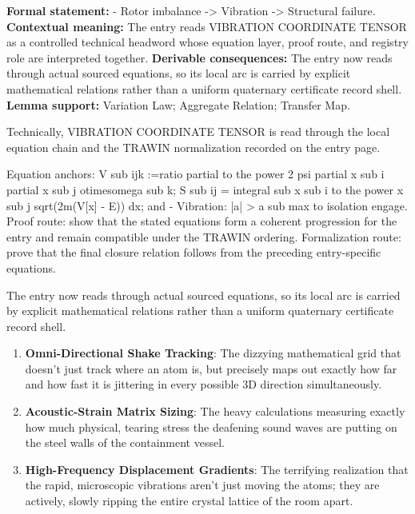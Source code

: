 \begingroup\footnotesize\setlength{\emergencystretch}{3em}\sloppy
\textbf{Formal statement:} - Rotor imbalance -> Vibration -> Structural failure. \textbf{Contextual meaning:} The entry reads VIBRATION COORDINATE TENSOR as a controlled technical headword whose equation layer, proof route, and registry role are interpreted together. \textbf{Derivable consequences:} The entry now reads through actual sourced equations, so its local arc is carried by explicit mathematical relations rather than a uniform quaternary certificate record shell. \textbf{Lemma support:} Variation Law; Aggregate Relation; Transfer Map.\par
\endgroup

Technically, VIBRATION COORDINATE TENSOR is read through the local equation chain and the TRAWIN normalization recorded on the entry page.

Equation anchors: V sub ijk :=ratio partial to the power 2 psi partial x sub i partial x sub j otimesomega sub k; S sub ij = integral sub x sub i to the power x sub j sqrt(2m(V[x] - E)) dx; and - Vibration: |a| > a sub max to isolation engage. Proof route: show that the stated equations form a coherent progression for the entry and remain compatible under the TRAWIN ordering. Formalization route: prove that the final closure relation follows from the preceding entry-specific equations.

The entry now reads through actual sourced equations, so its local arc is carried by explicit mathematical relations rather than a uniform quaternary certificate record shell.
\endgroup

\begin{enumerate}[leftmargin=1.6em,itemsep=6pt,topsep=4pt]
\item \textbf{Omni-Directional Shake Tracking}: The dizzying mathematical grid that doesn't just track where an atom is, but precisely maps out exactly how far and how fast it is jittering in every possible 3D direction simultaneously.
\item \textbf{Acoustic-Strain Matrix Sizing}: The heavy calculations measuring exactly how much physical, tearing stress the deafening sound waves are putting on the steel walls of the containment vessel.
\item \textbf{High-Frequency Displacement Gradients}: The terrifying realization that the rapid, microscopic vibrations aren't just moving the atoms; they are actively, slowly ripping the entire crystal lattice of the room apart.
\end{enumerate}

